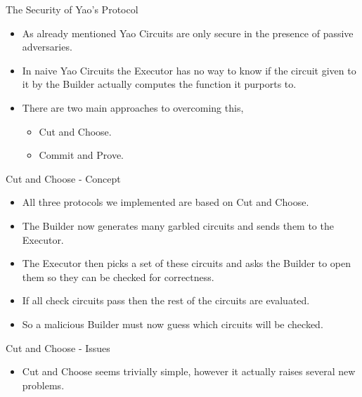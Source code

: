 \documentclass[t, 12pt]{beamer}            %
\begin{document}
\begin{frame}{The Security of Yao's Protocol}
	\begin{itemize}[<+->]
		\item As already mentioned Yao Circuits are only secure in the presence of passive adversaries. \footnotemark
		\item In naive Yao Circuits the Executor has no way to know if the circuit given to it by the Builder actually computes the function it purports to.
		\item There are two main approaches to overcoming this,
		\begin{itemize}
			\item Cut and Choose.
			\item Commit and Prove.
		\end{itemize}
	\end{itemize}
	
\end{frame}


\begin{frame}{Cut and Choose - Concept}
	\begin{itemize}[<+->]
		\item All three protocols we implemented are based on Cut and Choose.
		\item The Builder now generates many garbled circuits and sends them to the Executor.
		\item The Executor then picks a set of these circuits and asks the Builder to open them so they can be checked for correctness.
		\item If all check circuits pass then the rest of the circuits are evaluated.
		\item So a malicious Builder must now guess which circuits will be checked.
	\end{itemize}

\end{frame}


\begin{frame}{Cut and Choose - Issues}
	\begin{itemize}[<+->]
		\item Cut and Choose seems trivially simple, however it actually raises several new problems.
	\end{itemize}

\end{frame}
\end{document}

